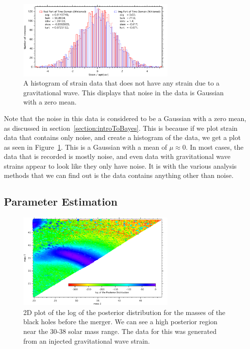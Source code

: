 \documentclass{article}
\begin{document}
 
    \begin{figure}[h]
    	\centering
    	\includegraphics[width=0.7\textwidth]{Figures/NoiseHistogram.pdf} 
    	\caption{A histogram of strain data that does not have any strain due to a gravitational wave. This displays that noise in the data is Gaussian with a zero mean.}
    	\label{Fig:NoiseHist}
    \end{figure}
    
 
 Note that the noise in this data is considered to be a Gaussian with a zero mean, as discussed in section~\ref{section:introToBayes}. This is because if we plot strain data that contains only noise, and create a histogram of the data, we get a plot as seen in Figure~\ref{Fig:NoiseHist}. This is a Gaussian with a mean of $\mu \approx 0$. In most cases, the data that is recorded is mostly noise, and even data with gravitational wave strains appear to look like they only have noise. It is with the various analysis methods that we can find out is the data contains anything other than noise.\\
  
 
 
 \subsection{Parameter Estimation}
 
     \begin{figure}[h]
     	\centering
     	\includegraphics[width=0.7\textwidth]{Figures/m1m2.pdf} 
     	\caption{2D plot of the log of the posterior distribution for the masses of the black holes before the merger. We can see a high posterior region near the 30-38 solar mass range. The data for this was generated from an injected gravitational wave strain.}
     	\label{Fig:2Dmasses}
     \end{figure}
 
\end{document}
